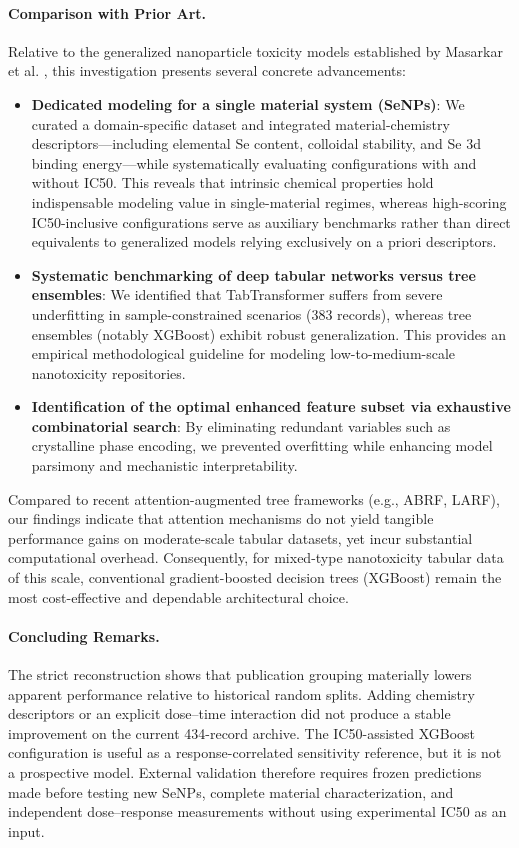 \paragraph{Comparison with Prior Art.}
Relative to the generalized nanoparticle toxicity models established by Masarkar et al. \cite{masarkar2024}, this investigation presents several concrete advancements:
\begin{itemize}
  \item \textbf{Dedicated modeling for a single material system (SeNPs)}: We curated a domain-specific dataset and integrated material-chemistry descriptors—including elemental Se content, colloidal stability, and Se 3d binding energy—while systematically evaluating configurations with and without IC50. This reveals that intrinsic chemical properties hold indispensable modeling value in single-material regimes, whereas high-scoring IC50-inclusive configurations serve as auxiliary benchmarks rather than direct equivalents to generalized models relying exclusively on a priori descriptors.
  \item \textbf{Systematic benchmarking of deep tabular networks versus tree ensembles}: We identified that TabTransformer suffers from severe underfitting in sample-constrained scenarios (383 records), whereas tree ensembles (notably XGBoost) exhibit robust generalization. This provides an empirical methodological guideline for modeling low-to-medium-scale nanotoxicity repositories.
  \item \textbf{Identification of the optimal enhanced feature subset via exhaustive combinatorial search}: By eliminating redundant variables such as crystalline phase encoding, we prevented overfitting while enhancing model parsimony and mechanistic interpretability.
\end{itemize}
Compared to recent attention-augmented tree frameworks (e.g., ABRF, LARF), our findings indicate that attention mechanisms do not yield tangible performance gains on moderate-scale tabular datasets, yet incur substantial computational overhead. Consequently, for mixed-type nanotoxicity tabular data of this scale, conventional gradient-boosted decision trees (XGBoost) remain the most cost-effective and dependable architectural choice.

\paragraph{Concluding Remarks.}
The strict reconstruction shows that publication grouping materially lowers apparent performance relative to historical random splits. Adding chemistry descriptors or an explicit dose--time interaction did not produce a stable improvement on the current 434-record archive. The IC50-assisted XGBoost configuration is useful as a response-correlated sensitivity reference, but it is not a prospective model. External validation therefore requires frozen predictions made before testing new SeNPs, complete material characterization, and independent dose--response measurements without using experimental IC50 as an input.
